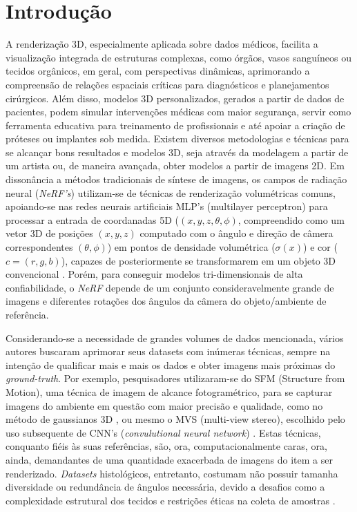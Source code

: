 \section{Introdução}
\label{sec:introducao}

A renderização 3D, especialmente aplicada sobre dados médicos, facilita a visualização integrada de estruturas complexas, como órgãos, vasos sanguíneos ou tecidos orgânicos, em geral, com perspectivas dinâmicas, aprimorando a compreensão de relações espaciais críticas para diagnósticos e planejamentos cirúrgicos. Além disso, modelos 3D personalizados, gerados a partir de dados de pacientes, podem simular intervenções médicas com maior segurança, servir como ferramenta educativa para treinamento de profissionais e até apoiar a criação de próteses ou implantes sob medida. Existem diversos metodologias e técnicas para se alcançar bons resultados e modelos 3D, seja através da modelagem a partir de um artista ou, de maneira avançada, obter modelos a partir de imagens 2D. Em dissonância a métodos tradicionais de síntese de imagens, os campos de radiação neural (\textit{NeRF's}) utilizam-se de técnicas de renderização volumétricas comuns, apoiando-se nas redes neurais artificiais MLP's (multilayer perceptron) para processar a entrada de coordanadas 5D ($(x, y, z, \theta, \phi)$, compreendido como um vetor 3D de posições $(x, y, z)$ computado com o ângulo e direção de câmera correspondentes $(\theta, \phi)$) em pontos de densidade volumétrica ($\sigma (x)$) e cor ($c = (r, g, b)$), capazes de posteriormente se transformarem em um objeto 3D convencional \cite{mildenhall2020nerfrepresentingscenesneural}. Porém, para conseguir modelos tri-dimensionais de alta confiabilidade, o \textit{NeRF} depende de um conjunto consideravelmente grande de imagens e diferentes rotações dos ângulos da câmera do objeto/ambiente de referência.

Considerando-se a necessidade de grandes volumes de dados mencionada, vários autores buscaram aprimorar seus datasets com inúmeras técnicas, sempre na intenção de qualificar mais e mais os dados e obter imagens mais próximas do \textit{ground-truth}. Por exemplo, pesquisadores utilizaram-se do SFM  (Structure from Motion), uma técnica de imagem de alcance fotogramétrico, para se capturar imagens do ambiente em questão com maior precisão e qualidade, como no método de gaussianos 3D \cite{kerbl3Dgaussians}, ou mesmo o MVS (multi-view stereo), escolhido pelo uso subsequente de CNN's (\textit{convulutional neural network}) \cite{chen2021mvsnerffastgeneralizableradiance}. Estas técnicas, conquanto fiéis às suas referências, são, ora, computacionalmente caras, ora, ainda, demandantes de uma quantidade exacerbada de imagens do item a ser renderizado. \textit{Datasets} histológicos, entretanto, costumam não possuir tamanha diversidade ou redundância de ângulos necessária, devido a desafios como a complexidade estrutural dos tecidos e restrições éticas na coleta de amostras \cite{XUE2021101816}.

